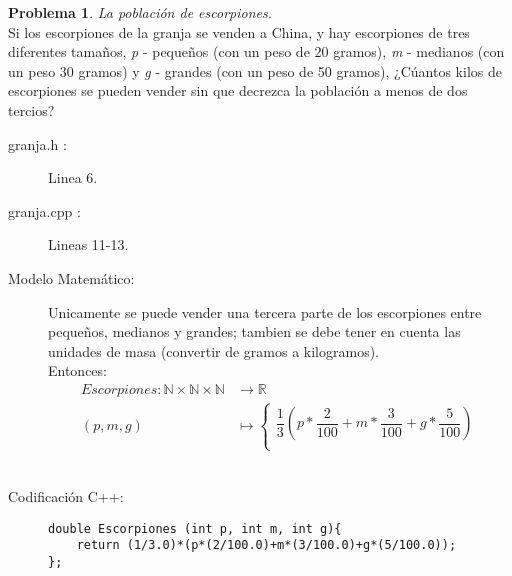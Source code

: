\documentclass{article}
\theoremstyle{plain}
\theoremstyle{definition}
\newtheorem{problem}{Problema}
\begin{document}
\begin{problem} \emph{La población de escorpiones.}\\
\hspace*{7mm}Si los escorpiones de la granja se venden a China, y hay escorpiones de tres diferentes tamaños, \emph{p} - pequeños (con un peso de 20 gramos), \emph{m} - medianos (con un peso 30 gramos) y \emph{g} - grandes (con un peso de 50 gramos), ¿Cúantos kilos de escorpiones se pueden vender sin que decrezca la población a menos de dos tercios?
%
\begin{description}
\item[granja.h :] Linea 6. \item[granja.cpp :] Lineas 11-13.

\item[Modelo Matemático:]
%
Unicamente se puede vender una tercera parte de los escorpiones entre pequeños, medianos y grandes; tambien se debe tener en cuenta las unidades de masa (convertir de gramos a kilogramos). \\
Entonces:
\begin{align*}
Escorpiones: \mathbb{N}\times\mathbb{N}\times\mathbb{N} &\to \mathbb{R}\\
(p,m,g) &\mapsto
\begin{cases}
\dfrac{1}{3}\left(p*\dfrac{2}{100}+m*\dfrac{3}{100}+g*\dfrac{5}{100}\right)\\
\end{cases}
\end{align*}
\\
\item[Codificación \textsf{C++}:]\hfill
%
\begin{verbatim}
double Escorpiones (int p, int m, int g){
    return (1/3.0)*(p*(2/100.0)+m*(3/100.0)+g*(5/100.0));
};

\end{verbatim}
\end{description}
\end{problem}
\end{document}
